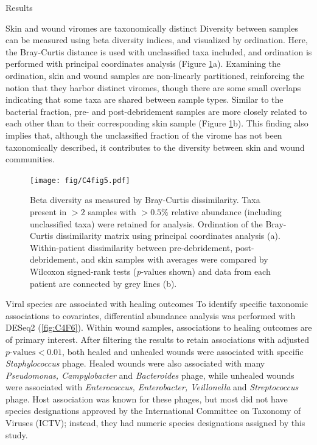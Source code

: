 \documentclass[oneside,12pt,final]{sty/ucthesis-CA2012}
\begin{document}
\begin{mainmatter}
\begin{section}{Results}
\begin{subsection}{Skin and wound viromes are taxonomically distinct}
Diversity between samples can be measured using beta diversity indices, and visualized by ordination. Here, the Bray-Curtis distance is used with unclassified taxa included, and ordination is performed with principal coordinates analysis (Figure \ref{fig:C4F5}a). Examining the ordination, skin and wound samples are non-linearly partitioned, reinforcing the notion that they harbor distinct viromes, though there are some small overlaps indicating that some taxa are shared between sample types. Similar to the bacterial fraction, pre- and post-debridement samples are more closely related to each other than to their corresponding skin sample (Figure \ref{fig:C4F5}b). This finding also implies that, although the unclassified fraction of the virome has not been taxonomically described, it contributes to the diversity between skin and wound communities.

\begin{figure}
\centering
\centerline{\texttt{[image: fig/C4fig5.pdf]}}
\caption{Beta diversity as measured by Bray-Curtis dissimilarity. Taxa present in $>2$ samples with $>0.5\%$ relative abundance (including unclassified taxa) were retained for analysis. Ordination of the Bray-Curtis dissimilarity matrix using principal coordinates analysis (a). Within-patient dissimilarity between pre-debridement, post-debridement, and skin samples with averages were compared by Wilcoxon signed-rank tests (\textit{p}-values shown) and data from each patient are connected by grey lines (b).}
\label{fig:C4F5}
\end{figure}
\end{subsection}

\begin{subsection}{Viral species are associated with healing outcomes}
To identify specific taxonomic associations to covariates, differential abundance analysis was performed with DESeq2 (\ref{fig:C4F6}). Within wound samples, associations to healing outcomes are of primary interest. After filtering the results to retain associations with adjusted $p\text{-values}<0.01$, both healed and unhealed wounds were associated with specific \textit{Staphylococcus} phage. Healed wounds were also associated with many \textit{Pseudomonas, Campylobacter} and \textit{Bacteroides} phage, while unhealed wounds were associated with \textit{Enterococcus, Enterobacter, Veillonella} and \textit{Streptococcus} phage. Host association was known for these phages, but most did not have species designations approved by the International Committee on Taxonomy of Viruses (ICTV); instead, they had numeric species designations assigned by this study. 


\end{subsection}
\end{section}
\end{mainmatter}
\end{document}
